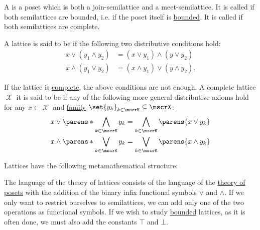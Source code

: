 \begin{definition}
\begin{thmenum}[series=def:semilattice]
     A  is a poset which is both a join-semilattice and a meet-semilattice. It is called  if both semilattices are bounded, i.e. if the poset itself is \hyperref[def:poset_extremal_points/top_and_bottom]{bounded}. It is called  if both semilattices are complete.

     A lattice is said to be  if the following two distributive conditions hold:
    \begin{align}
      x \vee (y_1 \wedge y_2) &= (x \vee y_1) \wedge (y \vee y_2) \label{eq:def:semilattice/distributive_lattice/finite/meet_of_joins} \\
      x \wedge (y_1 \vee y_2) &= (x \wedge y_1) \vee (y \wedge y_2) \label{eq:def:semilattice/distributive_lattice/finite/join_of_meets}.
    \end{align}

    If the lattice is \hyperref[def:semilattice/complete]{complete}, the above conditions are not enough. A complete lattice \( \mscrX \) it is said to be  if any of the following more general distributive axioms hold for any \( x \in \mscrX \) and \hyperref[def:indexed_family]{family} \( \set{ y_k }_{k \in \mscrK} \subseteq \mscrX \):
    \begin{align}
      x \vee \parens*{ \bigwedge_{k \in \mscrK} y_k } &= \bigwedge_{k \in \mscrK} \parens{ x \vee y_k } \label{eq:def:semilattice/distributive_lattice/arbitrary/meet_of_joins} \\
      x \wedge \parens*{ \bigvee_{k \in \mscrK} y_k } &= \bigvee_{k \in \mscrK} \parens{ x \wedge y_k } \label{eq:def:semilattice/distributive_lattice/arbitrary/join_of_meets}
    \end{align}
  \end{thmenum}

  Lattices have the following metamathematical structure:
  \begin{thmenum}[resume=def:semilattice]
     The language of the theory of lattices consists of the language of the \hyperref[def:poset/theory]{theory of posets} with the addition of the binary infix functional symbols \( \vee \) and \( \wedge \). If we only want to restrict ourselves to semilattices, we can add only one of the two operations as functional symbols. If we wish to study \hyperref[def:poset_extremal_points/top_and_bottom]{bounded} lattices, as it is often done, we must also add the constants \( \top \) and \( \bot \).


\end{thmenum}
\end{definition}
